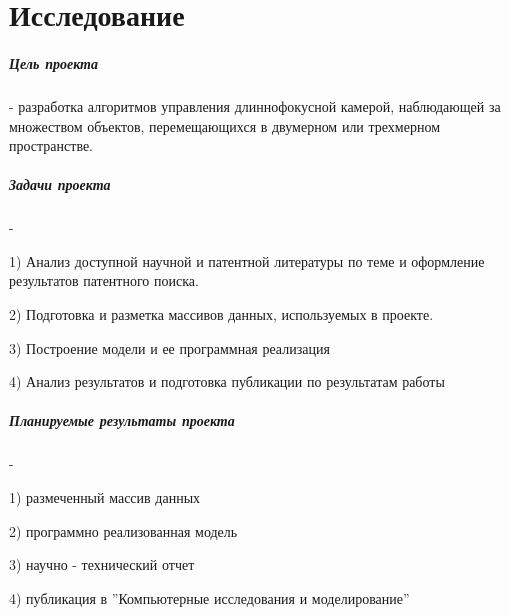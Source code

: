  \chapter*{Исследование  }
 
  
  
 \paragraph{Цель проекта} - разработка алгоритмов управления длиннофокусной камерой, наблюдающей за множеством объектов, перемещающихся в двумерном или трехмерном пространстве. 

 

 \paragraph{Задачи проекта} - 

1) Анализ доступной научной и патентной литературы по теме и оформление результатов патентного поиска. 

2) Подготовка и разметка массивов данных, используемых в проекте.   

3) Построение модели и ее программная реализация

4) Анализ результатов и подготовка публикации по результатам работы



 

 \paragraph{Планируемые результаты проекта} - 

1) размеченный массив данных

2) программно реализованная модель  

3) научно - технический отчет 

4) публикация в ''Компьютерные исследования и моделирование'' 

